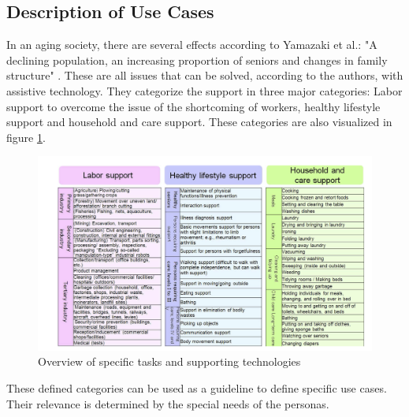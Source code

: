 \documentclass[plainarticle,zihtitle,english,final,hyperref,utf8]{zihpub}
\begin{document}
\newpage
\subsection{Description of Use Cases}
\label{sec:descriptionusecases}
In an aging society, there are several effects according to Yamazaki et al.: "A declining population, an increasing proportion of seniors and changes in family structure" . These are all issues that can be solved, according to the authors, with assistive technology. They categorize the support in three major categories: Labor support to overcome the issue of the shortcoming of workers, healthy lifestyle support and household and care support. These categories are also visualized in figure \ref{fig:yamazaki12}.\\
\begin{figure}[h!]
  \begin{center}
    \includegraphics[width=.95\textwidth]{robot_categories.png}
    \caption{Overview of specific tasks and supporting technologies }
    \label{fig:yamazaki12}
  \end{center}
\end{figure}
\newline
These defined categories can be used as a guideline to define specific use cases. Their relevance is determined by the special needs of the personas. \\
\newline
\end{document}

